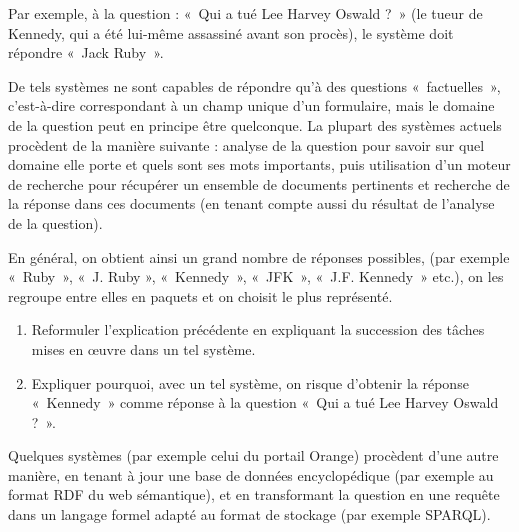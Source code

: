 \documentclass[a4paper, 11pt]{article}
\begin{document}
\begin{center}
\end{center}

Par exemple, à la question : « Qui a tué Lee Harvey Oswald ? » (le tueur de Kennedy, qui a été
lui-même assassiné avant son procès), le système doit répondre « Jack Ruby ».

De tels systèmes ne sont capables de répondre qu'à des questions « factuelles », c'est-à-dire
correspondant à un champ unique d'un formulaire, mais le domaine de la question peut en principe
être quelconque.
La plupart des systèmes actuels procèdent de la manière suivante : analyse de la question pour
savoir sur quel domaine elle porte et quels sont ses mots importants, puis utilisation d'un moteur
de recherche pour récupérer un ensemble de documents pertinents et recherche de la réponse dans ces
documents (en tenant compte aussi du résultat de l'analyse de la question).

En général, on obtient ainsi un grand nombre de réponses possibles, (par exemple « Ruby », « J. Ruby
», « Kennedy », « JFK », « J.F. Kennedy » etc.), on les regroupe entre elles en paquets et on
choisit le plus représenté.

\begin{enumerate}
    \item Reformuler l'explication précédente en expliquant la succession des tâches mises en œuvre
        dans un tel système.
    \item Expliquer pourquoi, avec un tel système, on risque d'obtenir la réponse « Kennedy » comme
        réponse à la question « Qui a tué Lee Harvey Oswald ? ».
\end{enumerate}

Quelques systèmes (par exemple celui du portail Orange) procèdent d'une autre manière, en tenant à
jour une base de données encyclopédique (par exemple au format RDF du web sémantique), et en
transformant la question en une requête dans un langage formel adapté au format de stockage (par
exemple SPARQL).
\end{document}
